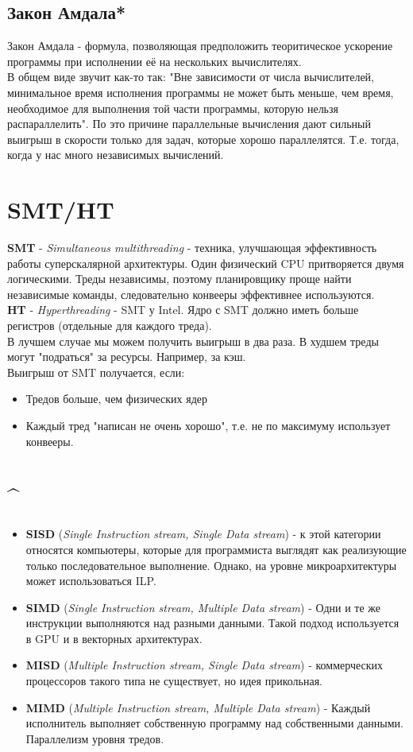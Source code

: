 \documentclass[12pt, a4paper]{article}
\begin{document}
\subsection{Закон Амдала*}
Закон Амдала - формула, позволяющая предположить теоритическое ускорение программы при исполнении её на нескольких вычислителях.\\
В общем виде звучит как-то так: "Вне зависимости от числа вычислителей, минимальное время исполнения программы не может быть меньше, чем время, необходимое для выполнения той части программы, которую нельзя распараллелить". По это причине параллельные вычисления дают сильный выигрыш в скорости только для задач, которые хорошо параллелятся. Т.е. тогда, когда у нас много независимых вычислений.
\section{SMT/HT}
\textbf{SMT} - \textit{Simultaneous multithreading} - техника, улучшающая эффективность работы суперскалярной архитектуры. Один физический CPU притворяется двумя логическими. Треды независимы, поэтому планировщику проще найти независимые команды, следовательно конвееры эффективнее используются.\\
\textbf{HT} - \textit{Hyperthreading} - SMT у Intel.
Ядро с SMT должно иметь больше регистров (отдельные для каждого треда).\\
В лучшем случае мы можем получить выигрыш в два раза. В худшем треды могут "подраться" за ресурсы. Например, за кэш.\\
Выигрыш от SMT получается, если:
\begin{itemize}
    \item Тредов больше, чем физических ядер
    \item Каждый тред "написан не очень хорошо", т.е. не по максимуму использует конвееры.
\end{itemize}
\section{\textasciicircum}
\begin{itemize}
    \item \textbf{SISD} (\textit{Single Instruction stream, Single Data stream}) - к этой категории относятся компьютеры, которые для программиста выглядят как реализующие только последовательное выполнение. Однако, на уровне микроархитектуры может использоваться ILP.
    \item \textbf{SIMD} (\textit{Single Instruction stream, Multiple Data stream}) - Одни и те же инструкции выполняются над разными данными. Такой подход используется в GPU и в векторных архитектурах.
    \item \textbf{MISD} (\textit{Multiple Instruction stream, Single Data stream}) - коммерческих процессоров такого типа не существует, но идея прикольная.
    \item \textbf{MIMD} (\textit{Multiple Instruction stream, Multiple Data stream}) - Каждый исполнитель выполняет собственную программу над собственными данными. Параллелизм уровня тредов.
\end{itemize}
\end{document}
